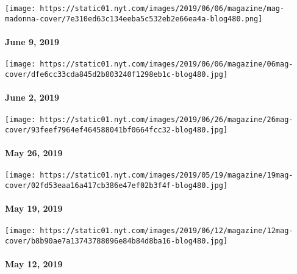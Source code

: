\href{https://www.nytimes.com/issue/magazine/2019/06/25/the-6919-issue}{}

\texttt{[image: https://static01.nyt.com/images/2019/06/06/magazine/mag-madonna-cover/7e310ed63c134eeba5c532eb2e66ea4a-blog480.png]}

\hypertarget{june-9-2019}{%
\paragraph{June 9, 2019}\label{june-9-2019}}

\href{https://www.nytimes.com/issue/magazine/2019/06/06/the-60219-issue}{}

\texttt{[image: https://static01.nyt.com/images/2019/06/06/magazine/06mag-cover/dfe6cc33cda845d2b803240f1298eb1c-blog480.jpg]}

\hypertarget{june-2-2019}{%
\paragraph{June 2, 2019}\label{june-2-2019}}

\href{https://www.nytimes.com/issue/magazine/2019/06/06/the-52619-issue}{}

\texttt{[image: https://static01.nyt.com/images/2019/06/26/magazine/26mag-cover/93feef7964ef464588041bf0664fcc32-blog480.jpg]}

\hypertarget{may-26-2019}{%
\paragraph{May 26, 2019}\label{may-26-2019}}

\href{https://www.nytimes.com/issue/magazine/2019/05/17/the-51919-issue}{}

\texttt{[image: https://static01.nyt.com/images/2019/05/19/magazine/19mag-cover/02fd53eaa16a417cb386e47ef02b3f4f-blog480.jpg]}

\hypertarget{may-19-2019}{%
\paragraph{May 19, 2019}\label{may-19-2019}}

\href{https://www.nytimes.com/issue/magazine/2019/05/17/the-51219-issue}{}

\texttt{[image: https://static01.nyt.com/images/2019/06/12/magazine/12mag-cover/b8b90ae7a13743788096e84b84d8ba16-blog480.jpg]}

\hypertarget{may-12-2019}{%
\paragraph{May 12, 2019}\label{may-12-2019}}

